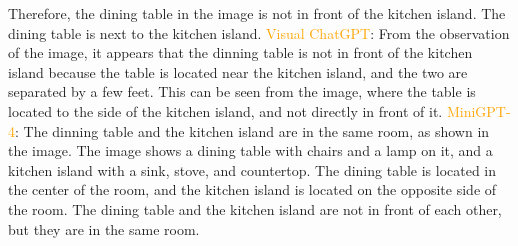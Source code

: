 \begin{enumerate}
    Therefore, the dining table in the image is not in front of the kitchen island. The dining table is next to the kitchen island.
    \subitem \textcolor{orange}{Visual ChatGPT}: From the observation of the image, it appears that the dinning table is not in front of the kitchen island because the table is located near the kitchen island, and the two are separated by a few feet. This can be seen from the image, where the table is located to the side of the kitchen island, and not directly in front of it.
    \subitem \textcolor{orange}{MiniGPT-4}: The dinning table and the kitchen island are in the same room, as shown in the image. The image shows a dining table with chairs and a lamp on it, and a kitchen island with a sink, stove, and countertop. The dining table is located in the center of the room, and the kitchen island is located on the opposite side of the room. The dining table and the kitchen island are not in front of each other, but they are in the same room.
\end{enumerate}
